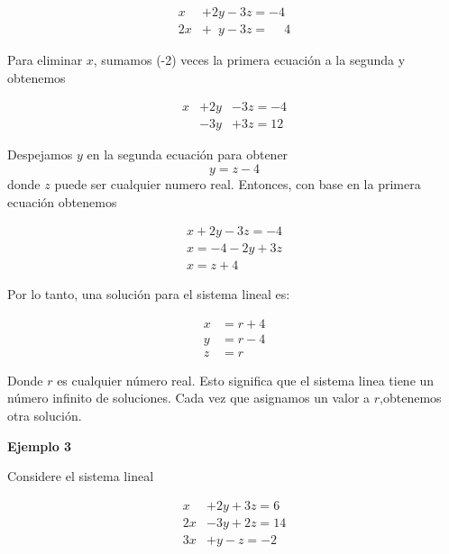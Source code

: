 \documentclass{article}
\begin{document}
\begin{equation*}
    \begin{aligned}
            x & +2y -3z = -4\\
            2x & +\phantom{2}y -3z = \phantom{-} 4
    \end{aligned}
\end{equation*}

Para eliminar $x$, sumamos (-2) veces la primera ecuación a la segunda y obtenemos

\begin{equation*}
    \begin{aligned}
            x & +2y &-3z = -4\\
            & -3y &+3z = 12
    \end{aligned}
\end{equation*}

Despejamos $y$ en la segunda ecuación para obtener $$y=z-4$$ donde $z$ puede ser cualquier numero real. Entonces, con base en la primera ecuación obtenemos 

\begin{equation*}
    \begin{matrix}
            x + 2y - 3z = -4\\
            x = -4 -2y +3z\\
            x= z + 4
    \end{matrix}
\end{equation*}

Por lo tanto, una solución para el sistema lineal es: 

\begin{equation*}
    \begin{aligned}
            x & = r + 4\\
            y & = r - 4\\
            z &= r
    \end{aligned}
\end{equation*}

Donde $r$ es cualquier número real. Esto significa que el sistema linea tiene un número infinito de soluciones. Cada vez que asignamos un valor a $r$,obtenemos otra solución.

\begin{large}
    \textbf{Ejemplo 3}
\end{large}
Considere el sistema lineal

\begin{equation*}
    \begin{aligned}
            x & +2y + 3z = 6\\
            2x & -3y + 2z = 14\\
            3x & +y - z = -2
    \end{aligned}
\end{equation*}
\end{document}
